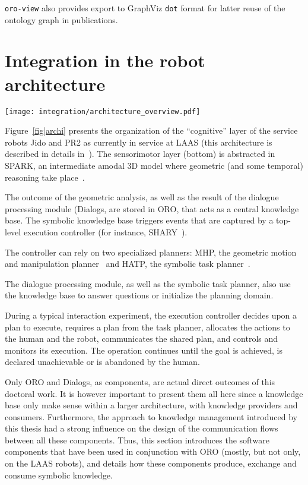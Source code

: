 {\tt oro-view} also provides export to GraphViz {\tt dot} format for latter
reuse of the ontology graph in publications.

\section{Integration in the robot architecture}

\begin{figure*}[thpb]
  \centering
  \texttt{[image: integration/architecture\_overview.pdf]}
  \caption {Software architecture for a service robot interacting with humans.}
  \label{fig|archi}
\end{figure*}

Figure~\ref{fig|archi} presents the organization of the ``cognitive'' layer of
the service robots Jido and PR2 as currently in service at LAAS (this
architecture is described in details in~\cite{Alami2011}). The sensorimotor
layer (bottom) is abstracted in SPARK, an intermediate amodal 3D model where
geometric (and some temporal) reasoning take place~\cite{Sisbot2011}.

The outcome of the geometric analysis, as well as the result of the dialogue
processing module ({\sc Dialogs}, are stored in ORO, that acts as a central
knowledge base. The symbolic knowledge base triggers events that are captured
by a top-level execution controller (for instance, SHARY~\cite{Warnier2012}).

The controller can rely on two specialized planners: MHP, the geometric motion
and manipulation planner~\cite{Sisbot2008, Mainprice2011, Pandey2010} and HATP,
the symbolic task planner~\cite{Alili2008}.

The dialogue processing module, as well as the symbolic task planner, also use
the knowledge base to answer questions or initialize the planning domain.

During a typical interaction experiment, the execution controller decides upon
a plan to execute, requires a plan from the task planner, allocates the actions
to the human and the robot, communicates the shared plan, and controls and
monitors its execution. The operation continues until the goal is achieved, is
declared unachievable or is abandoned by the human.

Only ORO and Dialogs, as components, are actual direct outcomes of this
doctoral work. It is however important to present them all here since a
knowledge base only make sense within a larger architecture, with knowledge
providers and consumers.  Furthermore, the approach to knowledge management
introduced by this thesis had a strong influence on the design of the
communication flows between all these components. Thus, this section introduces
the software components that have been used in conjunction with ORO (mostly,
but not only, on the LAAS robots), and details how these components produce,
exchange and consume symbolic knowledge.

